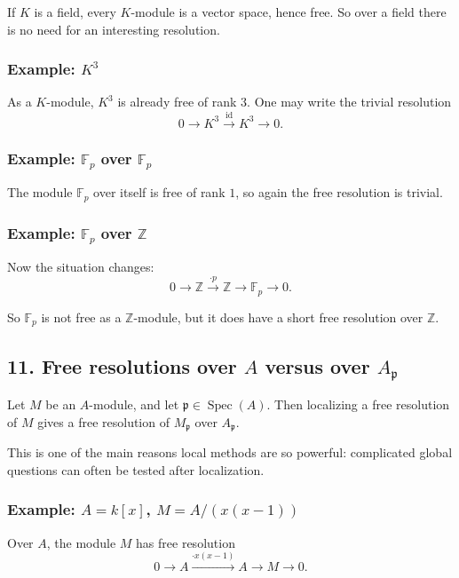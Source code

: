 \documentclass[12pt,a4paper]{article}
\theoremstyle{notespace}
\newcommand{\Spec}{\operatorname{Spec}}
\theoremstyle{definition}
\begin{document}
If \(K\) is a field, every \(K\)-module is a vector space, hence free.
So over a field there is no need for an interesting resolution.

\subsubsection*{Example: \(K^3\)}

As a \(K\)-module, \(K^3\) is already free of rank \(3\). One may write the trivial resolution
\[
0 \longrightarrow K^3 \xrightarrow{\mathrm{id}} K^3 \longrightarrow 0.
\]

\subsubsection*{Example: \(\mathbb F_p\) over \(\mathbb F_p\)}

The module \(\mathbb F_p\) over itself is free of rank \(1\), so again the free resolution is trivial.

\subsubsection*{Example: \(\mathbb F_p\) over \(\mathbb Z\)}

Now the situation changes:
\[
0 \longrightarrow \mathbb Z \xrightarrow{\cdot p} \mathbb Z \longrightarrow \mathbb F_p \longrightarrow 0.
\]

So \(\mathbb F_p\) is not free as a \(\mathbb Z\)-module, but it does have a short free resolution over \(\mathbb Z\).

\subsection{11. Free resolutions over \(A\) versus over \(A_{\mathfrak p}\)}

Let \(M\) be an \(A\)-module, and let \(\mathfrak p\in \Spec(A)\). Then localizing a free resolution of \(M\) gives a free resolution of \(M_{\mathfrak p}\) over \(A_{\mathfrak p}\).

This is one of the main reasons local methods are so powerful:
complicated global questions can often be tested after localization.

\subsubsection*{Example: \(A=k[x]\), \(M=A/(x(x-1))\)}

Over \(A\), the module \(M\) has free resolution
\[
0 \longrightarrow A \xrightarrow{\cdot x(x-1)} A \longrightarrow M \longrightarrow 0.
\]
\end{document}
